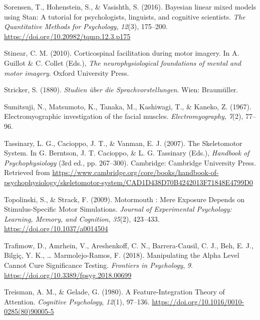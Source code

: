 \documentclass[a4paper,12pt,twoside,openright,oldfontcommands]{memoir}
\begin{document}
\leavevmode\hypertarget{ref-sorensen_bayesian_2016}{}%
Sorensen, T., Hohenstein, S., \& Vasishth, S. (2016). Bayesian linear mixed models using Stan: A tutorial for psychologists, linguists, and cognitive scientists. \emph{The Quantitative Methods for Psychology}, \emph{12}(3), 175--200. \url{https://doi.org/10.20982/tqmp.12.3.p175}

\leavevmode\hypertarget{ref-stinear_corticospinal_2010}{}%
Stinear, C. M. (2010). Corticospinal facilitation during motor imagery. In A. Guillot \& C. Collet (Eds.), \emph{The neurophysiological foundations of mental and motor imagery}. Oxford University Press.

\leavevmode\hypertarget{ref-stricker_studien_1880}{}%
Stricker, S. (1880). \emph{Studien über die Sprachvorstellungen}. Wien: Braumüller.

\leavevmode\hypertarget{ref-sumitsuji_electromyographic_1967}{}%
Sumitsuji, N., Matsumoto, K., Tanaka, M., Kashiwagi, T., \& Kaneko, Z. (1967). Electromyographic investigation of the facial muscles. \emph{Electromyography}, \emph{7}(2), 77--96.

\leavevmode\hypertarget{ref-berntson_skeletomotor_2007}{}%
Tassinary, L. G., Cacioppo, J. T., \& Vanman, E. J. (2007). The Skeletomotor System. In G. Berntson, J. T. Cacioppo, \& L. G. Tassinary (Eds.), \emph{Handbook of Psychophysiology} (3rd ed., pp. 267--300). Cambridge: Cambridge University Press. Retrieved from \url{https://www.cambridge.org/core/books/handbook-of-psychophysiology/skeletomotor-system/CAD1D438D70B4242013F71848E4799D0}

\leavevmode\hypertarget{ref-topolinski_motormouth_2009}{}%
Topolinski, S., \& Strack, F. (2009). Motormouth : Mere Exposure Depends on Stimulus-Specific Motor Simulations. \emph{Journal of Experimental Psychology: Learning, Memory, and Cognition}, \emph{35}(2), 423--433. \url{https://doi.org/10.1037/a0014504}

\leavevmode\hypertarget{ref-trafimow_manipulating_2018}{}%
Trafimow, D., Amrhein, V., Areshenkoff, C. N., Barrera-Causil, C. J., Beh, E. J., Bilgiç, Y. K., \ldots{} Marmolejo-Ramos, F. (2018). Manipulating the Alpha Level Cannot Cure Significance Testing. \emph{Frontiers in Psychology}, \emph{9}. \url{https://doi.org/10.3389/fpsyg.2018.00699}

\leavevmode\hypertarget{ref-treisman_feature-integration_1980}{}%
Treisman, A. M., \& Gelade, G. (1980). A Feature-Integration Theory of Attention. \emph{Cognitive Psychology}, \emph{12}(1), 97--136. \url{https://doi.org/10.1016/0010-0285(80)90005-5}
\end{document}

